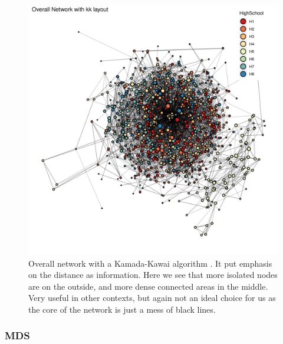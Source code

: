     \begin{figure}[h!]
        \centering
            \includegraphics[width=0.7\linewidth]{figures/Networks/Layouts/Graph_OverallNetwork_with_no_highlight_kk_HighSchool___kk.png} 
        \caption{Overall network with a Kamada-Kawai algorithm \cite{Kamada1989}. It put emphasis on the distance as information. Here we see that more isolated nodes are on the outside, and more dense connected areas in the middle. Very useful in other contexts, but again not an ideal choice for us as the core of the network is just a mess of black lines.}
        \label{figure:networksLayoutsKK}
    \end{figure}    

    \newpage

\subsubsection{MDS}

